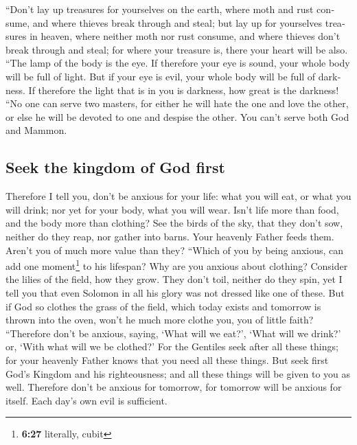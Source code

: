 \begin{paracol}{2}
\begin{otherlanguage}{english}
 ``Don't lay up treasures for yourselves on the earth,
where moth and rust consume, and where thieves break through and steal;
 but lay up for yourselves treasures in heaven, where
neither moth nor rust consume, and where thieves don't break through and
steal;  for where your treasure is, there your heart will
be also.  ``The lamp of the body is the eye. If therefore
your eye is sound, your whole body will be full of light.
 But if your eye is evil, your whole body will be full of
darkness. If therefore the light that is in you is darkness, how great
is the darkness!  ``No one can serve two masters, for
either he will hate the one and love the other, or else he will be
devoted to one and despise the other. You can't serve both God and
Mammon.

\hypertarget{seek-the-kingdom-of-god-first}{%
\subsection{Seek the kingdom of God
first}\label{seek-the-kingdom-of-god-first}}

 Therefore I tell you, don't be anxious for your life:
what you will eat, or what you will drink; nor yet for your body, what
you will wear. Isn't life more than food, and the body more than
clothing?  See the birds of the sky, that they don't sow,
neither do they reap, nor gather into barns. Your heavenly Father feeds
them. Aren't you of much more value than they?  ``Which
of you by being anxious, can add one moment\footnote{\textbf{6:27}
  literally, cubit} to his lifespan?  Why are you anxious
about clothing? Consider the lilies of the field, how they grow. They
don't toil, neither do they spin,  yet I tell you that
even Solomon in all his glory was not dressed like one of these.
 But if God so clothes the grass of the field, which
today exists and tomorrow is thrown into the oven, won't he much more
clothe you, you of little faith?  ``Therefore don't be
anxious, saying, `What will we eat?', `What will we drink?' or, `With
what will we be clothed?'  For the Gentiles seek after
all these things; for your heavenly Father knows that you need all these
things.  But seek first God's Kingdom and his
righteousness; and all these things will be given to you as well.
 Therefore don't be anxious for tomorrow, for tomorrow
will be anxious for itself. Each day's own evil is sufficient.


\end{otherlanguage}
\end{paracol}
